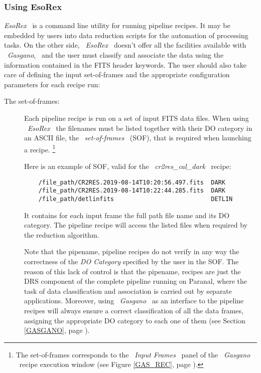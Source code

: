 \clearpage


\subsubsection{Using EsoRex}
\label{ESOREX}

{\it EsoRex} \ is a command line utility for running pipeline recipes. 
It may be embedded by users into data reduction scripts for the automation 
of processing tasks. On the other side, \ {\it EsoRex} \ doesn't offer 
all the facilities available with \ {\it Gasgano}, \ and the user must 
classify and associate the data using the information contained in 
the FITS header keywords.
The user should also take care of defining the input set-of-frames and 
the appropriate configuration parameters for each recipe run:

\begin{description}

\item [The set-of-frames:]
\label{SOF}
Each pipeline recipe is run on a set of input FITS data files. 
When using \ {\it EsoRex} \ the 
filenames must be listed together with their DO category in an ASCII file, 
the \ {\it set-of-frames} \ (SOF), that is required when launching a recipe.
\footnote{The set-of-frames corresponds to the \ {\it Input Frames} \ panel
of the \ {\it Gasgano} \ recipe execution window (see Figure \ref{GAS_REC},
page \pageref{GAS_REC}).}

Here is an example of SOF, valid for the \ {\it cr2res\_cal\_dark} \ recipe:
\begin{verbatim}
    /file_path/CR2RES.2019-08-14T10:20:56.497.fits  DARK
    /file_path/CR2RES.2019-08-14T10:22:44.285.fits  DARK
    /file_path/detlinfits                           DETLIN
\end{verbatim}

It contains for each input frame the full path file name and its 
DO category.
The pipeline recipe will access the listed files when required 
by the reduction algorithm.

Note that the pipename, pipeline recipes do not verify in any way the 
correctness of the {\it DO Category} specified by the user in the SOF. 
The reason of this lack of control is that the pipename, recipes are just 
the DRS component of the complete pipeline running on Paranal, where 
the task of data classification and association is carried out by 
separate applications. Moreover, using \ {\it Gasgano} \ as
an interface to the pipeline recipes will always ensure a correct
classification of all the data frames, assigning the appropriate 
DO category to each one of them (see Section \ref{GASGANO}, page
\pageref{GASGANO}).


\end{description}
